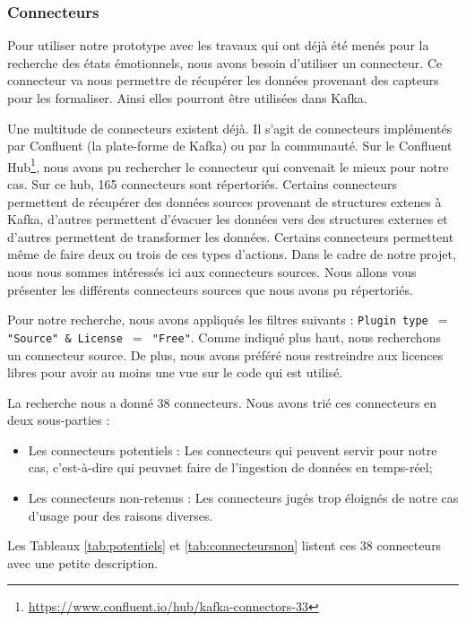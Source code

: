 \documentclass[11pt]{article}
\begin{document}
		\subsubsection{Connecteurs}
			Pour utiliser notre prototype avec les travaux qui ont déjà été menés pour la recherche des états émotionnels, nous avons besoin d'utiliser un connecteur.
			Ce connecteur va nous permettre de récupérer les données provenant des capteurs pour les formaliser.
			Ainsi elles pourront être utilisées dans Kafka.\par
			Une multitude de connecteurs existent déjà. 
			Il s'agit de connecteurs implémentés par Confluent (la plate-forme de Kafka) ou par la communauté.
			Sur le Confluent Hub\footnote{\href{https://www.confluent.io/hub/kafka-connectors-33}{https://www.confluent.io/hub/kafka-connectors-33}}, nous avons pu rechercher le connecteur qui convenait le mieux pour notre cas.
			Sur ce hub, 165 connecteurs sont répertoriés.
			Certains connecteurs permettent de récupérer des données sources provenant de structures extenes à Kafka, d'autres permettent d'évacuer les données vers des structures externes et d'autres permettent de transformer les données.
			Certains connecteurs permettent même de faire deux ou trois de ces types d'actions. 
			Dans le cadre de notre projet, nous nous sommes intéressés ici aux connecteurs sources.
			Nous allons vous présenter les différents connecteurs sources que nous avons pu répertoriés.\par
			Pour notre recherche, nous avons appliqués les filtres suivants : \newline
			\texttt{Plugin type $=$ "Source" \& License $=$ "Free"}.\newline
			Comme indiqué plus haut, nous recherchons un connecteur source.
			De plus, nous avons préféré nous restreindre aux licences libres pour avoir au moins une vue sur le code qui est utilisé.\par
			La recherche nous a donné 38 connecteurs.
			Nous avons trié ces connecteurs en deux sous-parties :
			\begin{itemize}
				\item Les connecteurs potentiels : Les connecteurs qui peuvent servir pour notre cas, c'est-à-dire qui peuvnet faire de l’ingestion de données en temps-réel;
				\item Les connecteurs non-retenus : Les connecteurs jugés trop éloignés de notre cas d’usage pour des raisons diverses.
			\end{itemize}
			Les Tableaux \ref{tab:potentiels} et \ref{tab:connecteursnon} listent ces 38 connecteurs avec une petite description.\par
\end{document}
